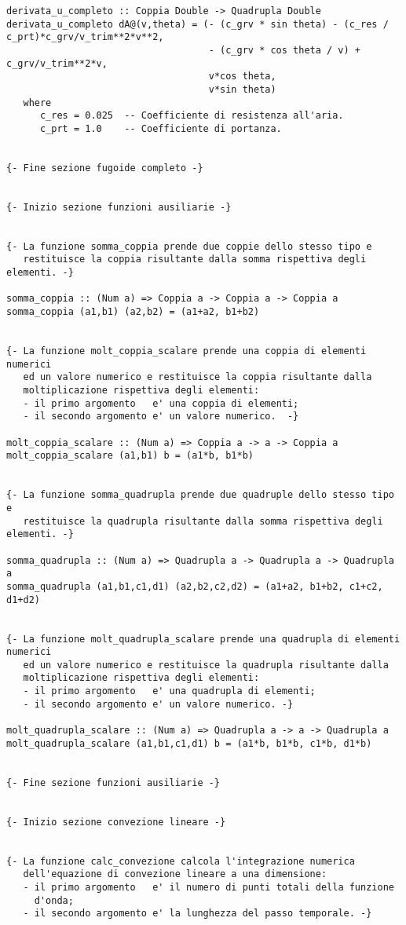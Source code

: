 \begin{verbatim}
derivata_u_completo :: Coppia Double -> Quadrupla Double
derivata_u_completo dA@(v,theta) = (- (c_grv * sin theta) - (c_res / c_prt)*c_grv/v_trim**2*v**2,
                                    - (c_grv * cos theta / v) + c_grv/v_trim**2*v,
                                    v*cos theta,
                                    v*sin theta)
   where
      c_res = 0.025  -- Coefficiente di resistenza all'aria.
      c_prt = 1.0    -- Coefficiente di portanza.


{- Fine sezione fugoide completo -}


{- Inizio sezione funzioni ausiliarie -}


{- La funzione somma_coppia prende due coppie dello stesso tipo e 
   restituisce la coppia risultante dalla somma rispettiva degli elementi. -}

somma_coppia :: (Num a) => Coppia a -> Coppia a -> Coppia a
somma_coppia (a1,b1) (a2,b2) = (a1+a2, b1+b2)


{- La funzione molt_coppia_scalare prende una coppia di elementi numerici
   ed un valore numerico e restituisce la coppia risultante dalla 
   moltiplicazione rispettiva degli elementi:
   - il primo argomento   e' una coppia di elementi;
   - il secondo argomento e' un valore numerico.  -}

molt_coppia_scalare :: (Num a) => Coppia a -> a -> Coppia a
molt_coppia_scalare (a1,b1) b = (a1*b, b1*b)


{- La funzione somma_quadrupla prende due quadruple dello stesso tipo e 
   restituisce la quadrupla risultante dalla somma rispettiva degli elementi. -}

somma_quadrupla :: (Num a) => Quadrupla a -> Quadrupla a -> Quadrupla a
somma_quadrupla (a1,b1,c1,d1) (a2,b2,c2,d2) = (a1+a2, b1+b2, c1+c2, d1+d2)


{- La funzione molt_quadrupla_scalare prende una quadrupla di elementi numerici
   ed un valore numerico e restituisce la quadrupla risultante dalla 
   moltiplicazione rispettiva degli elementi:
   - il primo argomento   e' una quadrupla di elementi;
   - il secondo argomento e' un valore numerico. -}

molt_quadrupla_scalare :: (Num a) => Quadrupla a -> a -> Quadrupla a
molt_quadrupla_scalare (a1,b1,c1,d1) b = (a1*b, b1*b, c1*b, d1*b)


{- Fine sezione funzioni ausiliarie -}


{- Inizio sezione convezione lineare -}


{- La funzione calc_convezione calcola l'integrazione numerica
   dell'equazione di convezione lineare a una dimensione:
   - il primo argomento   e' il numero di punti totali della funzione
     d'onda;
   - il secondo argomento e' la lunghezza del passo temporale. -}


\end{verbatim}
